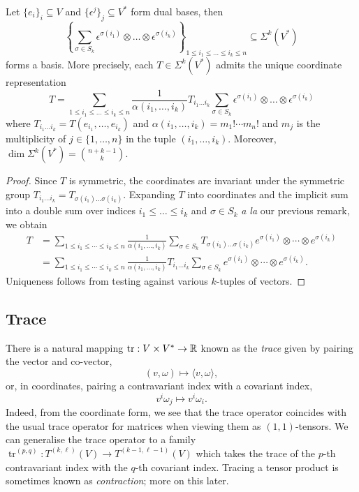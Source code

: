 	
\begin{proposition}
	Let $\{ e_i \}_i \subseteq V$ and $\{ \epsilon^j\}_j \subseteq V^*$ form dual bases, then 
		\[ \left\{ \sum_{\sigma \in S_k} \epsilon^{\sigma(i_1)} \otimes \dots \otimes \epsilon^{\sigma(i_k)}  \right\}_{1 \leq i_1 \leq \dots \leq i_k \leq n} \subseteq \Sigma^k (V^*) \]
	forms a basis. More precisely, each $T \in \Sigma^k (V^*)$ admits the unique coordinate representation
		\[ T = \sum_{1 \leq i_1 \leq \dots \leq i_k \leq n} \frac{1}{\alpha (i_1, \dots, i_k)} T_{{i_1} \dots{i_k}} \sum_{\sigma \in S_k} \epsilon^{\sigma(i_1)} \otimes \dots \otimes \epsilon^{\sigma(i_k)} \]
	where $T_{{i_1} \dots{i_k}} = T(e_{i_1}, \dots, e_{i_k})$ and $\alpha(i_1,\dots,i_k) = m_1! \cdots m_n!$ and $m_j$ is the multiplicity of $j \in \{1, \dots, n\}$ in the tuple $(i_1, \dots, i_k)$. Moreover, $\dim \Sigma^k (V^*) = \binom{n + k - 1}{k}$. 
\end{proposition}

\begin{proof}
	Since $T$ is symmetric, the coordinates are invariant under the symmetric group $ T_{{i_1} \dots{i_k}}  = T_{{\sigma(i_1)} \dots{\sigma(i_k)}}$. Expanding $T$ into coordinates and the implicit sum into a double sum over indices $i_1 \leq \dots \leq i_k$ and $\sigma \in S_k$ \textit{a la} our previous remark, we obtain
	\begin{align*}
		T 
			&=  \sum_{1 \leq i_1 \leq \cdots \leq i_k \leq n} \frac 1{\alpha(i_1,\dots,i_k)} \sum_{\sigma \in S_k} T_{{\sigma(i_1)} \dots{\sigma(i_k)}}  e^{\sigma(i_1)} \otimes \cdots \otimes e^{\sigma(i_k)}\\
			&=  \sum_{1 \leq i_1 \leq \cdots \leq i_k \leq n} \frac 1{\alpha(i_1,\dots,i_k)}  T_{{i_1} \dots{i_k}} \sum_{\sigma \in S_k}  e^{\sigma(i_1)} \otimes \cdots \otimes e^{\sigma(i_k)}.
	\end{align*}
	Uniqueness follows from testing against various $k$-tuples of vectors. 
\end{proof}

\subsection{Trace}	

There is a natural mapping $\operatorname{tr}: V \times V^* \to \mathbb R$ known as the \emph{trace} given by pairing the vector and co-vector, 
	\[  (v, \omega) \mapsto \langle v, \omega \rangle, \] 
or, in coordinates, pairing a contravariant index with a covariant index, 
	\[ v^i \omega_j \mapsto v^i \omega_i. \]
Indeed, from the coordinate form, we see that the trace operator coincides with the usual trace operator for matrices when viewing them as $(1, 1)$-tensors. We can generalise the trace operator to a family $\operatorname{tr}^{(p, q)} : T^{(k, \ell)} (V) \to T^{(k - 1, \ell - 1)} (V)$ which takes the trace of the $p$-th contravariant index with the $q$-th covariant index. Tracing a tensor product is sometimes known as \textit{contraction}; more on this later. 


